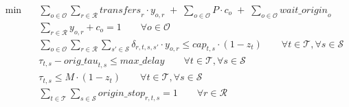\begin{align}
  \min\quad & \sum_{o \in \mathcal{O}} \sum_{r \in \mathcal{R}} \mathit{transfers}_{r} \cdot y_{o,r} \;+\; \sum_{o \in \mathcal{O}} P \cdot c_{o} \;+\; \sum_{o \in \mathcal{O}} \mathit{wait\_origin}_{o} \tag{gen\_travel\_time} \\
  & \sum_{r \in \mathcal{R}} y_{o,r} + c_{o} = 1 \qquad \forall o \in \mathcal{O} \tag{assign} \\
  & \sum_{o \in \mathcal{O}} \sum_{r \in \mathcal{R}} \sum_{s' \in \mathcal{S}} \delta_{r,t,s,s'} \cdot y_{o,r} \le \mathit{cap}_{t,s} \cdot (1 - z_{t}) \qquad \forall t \in \mathcal{T}, \forall s \in \mathcal{S} \tag{capacity} \\
  & \tau_{t,s} - \mathit{orig\_tau}_{t,s} \le \mathit{max\_delay} \qquad \forall t \in \mathcal{T}, \forall s \in \mathcal{S} \tag{delay\_bound} \\
  & \tau_{t,s} \le M \cdot (1 - z_{t}) \qquad \forall t \in \mathcal{T}, \forall s \in \mathcal{S} \tag{cancel\_time} \\
  & \sum_{t \in \mathcal{T}} \sum_{s \in \mathcal{S}} \mathit{origin\_stop}_{r,t,s} = 1 \qquad \forall r \in \mathcal{R} \tag{boarding\_one}
\end{align}